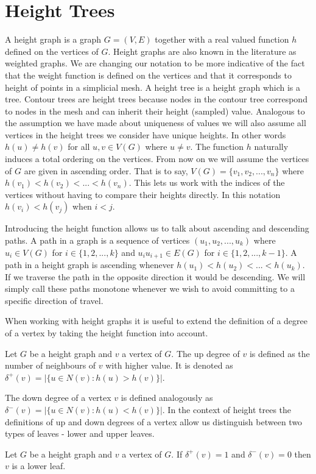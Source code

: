 \section{Height Trees}

A height graph is a graph $G = (V, E)$ together with a real valued function $h$ defined on the vertices of $G$. Height graphs are also known in the literature as weighted graphs. We are changing our notation to be more indicative of the fact that the weight function is defined on the vertices and that it corresponds to height of points in a simplicial mesh. A height tree is a height graph which is a tree. Contour trees are height trees because nodes in the contour tree correspond to nodes in the mesh and can inherit their height (sampled) value. Analogous to the assumption we have made about uniqueness of values we will also assume all vertices in the height trees we consider have unique heights. In other words $h(u) \ne h(v)$ for all $u ,v \in V(G)$ where $u \ne v$. The function $h$ naturally induces a total ordering on the vertices. From now on we will assume the vertices of $G$ are given in ascending order. That is to say, $V(G) = \{v_1, v_2, ... , v_n\}$ where $h(v_1) < h(v_2) < ... < h(v_n)$. This lets us work with the indices of the vertices without having to compare their heights directly. In this notation $h(v_i) < h(v_j)$ when $i < j$.

Introducing the height function allows us to talk about ascending and descending paths. A path in a graph is a sequence of vertices $(u_1, u_2, ... , u_k)$ where $u_i \in V(G)$ for $i \in \{1, 2, ..., k\}$ and $u_iu_{i+1} \in E(G)$ for $i \in \{1, 2, ..., k-1\}$. A path in a height graph is ascending whenever $h(u_1) < h(u_2) < ... < h(u_k)$. If we traverse the path in the opposite direction it would be descending. We will simply call these paths monotone whenever we wish to avoid committing to a specific direction of travel.

When working with height graphs it is useful to extend the definition of a degree of a vertex by taking the height function into account.

\begin{defn} Let $G$ be a height graph and $v$ a vertex of $G$. The up degree of $v$ is defined as the number of neighbours of $v$ with higher value. It is denoted as $\delta^+(v) = \big|\{ u \in N(v) : h(u) > h(v) \}\big|$.   \end{defn}

The down degree of a vertex $v$ is defined analogously as $\delta^-(v) = \big|\{ u \in N(v) : h(u) < h(v) \}\big|$. In the context of height trees the definitions of up and down degrees of a vertex allow us distinguish between two types of leaves - lower and upper leaves.
\begin{defn} Let $G$ be a height graph and $v$ a vertex of $G$. If  $\delta^+(v) = 1$ and $\delta^-(v) = 0$ then $v$ is a lower leaf.  \end{defn}


